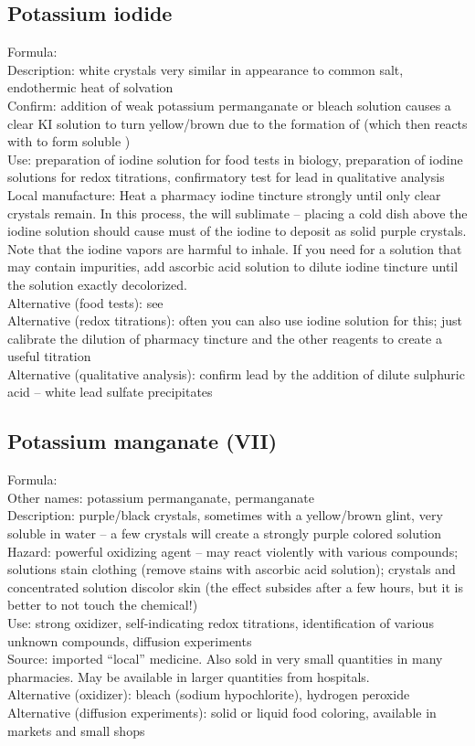 \subsection{Potassium iodide}
\label{sec:potiodide}
Formula: \\
Description: white crystals very similar in appearance to common salt, 
endothermic heat of solvation\\
Confirm: addition of weak potassium permanganate 
or bleach solution causes a clear KI solution to turn yellow/brown 
due to the formation of  (which then reacts with  to form soluble )\\
Use: preparation of iodine solution for food tests in biology, 
preparation of iodine solutions for redox titrations, 
confirmatory test for lead in qualitative analysis\\
Local manufacture: Heat a pharmacy iodine tincture strongly until 
only clear crystals remain. 
In this process, 
the  will sublimate -- 
placing a cold dish above the iodine solution should cause must of the iodine 
to deposit as solid purple crystals. 
Note that the iodine vapors are harmful to inhale.
If you need  for a solution that may contain impurities, 
add ascorbic acid solution to dilute iodine tincture 
until the solution exactly decolorized.\\
Alternative (food tests): see \\
Alternative (redox titrations): 
often you can also use iodine solution for this; 
just calibrate the dilution of pharmacy tincture 
and the other reagents to create a useful titration\\
Alternative (qualitative analysis): 
confirm lead by the addition of dilute sulphuric acid -- 
white lead sulfate precipitates
\subsection{Potassium manganate (VII)}
Formula: \\
Other names: potassium permanganate, 
permanganate\\
Description: purple/black crystals, 
sometimes with a yellow/brown glint, 
very soluble in water -- 
a few crystals will create a strongly purple colored solution\\
Hazard: powerful oxidizing agent -- 
may react violently with various compounds; 
solutions stain clothing (remove stains with ascorbic acid solution); 
crystals and concentrated solution discolor skin 
(the effect subsides after a few hours, 
but it is better to not touch the chemical!)\\
Use: strong oxidizer, 
self-indicating redox titrations, 
identification of various unknown compounds, 
diffusion experiments\\
Source: imported ``local'' medicine. 
Also sold in very small quantities in many pharmacies. 
May be available in larger quantities from hospitals.\\
Alternative (oxidizer): bleach (sodium hypochlorite), 
hydrogen peroxide\\
Alternative (diffusion experiments): solid or liquid food coloring, 
available in markets and small shops
